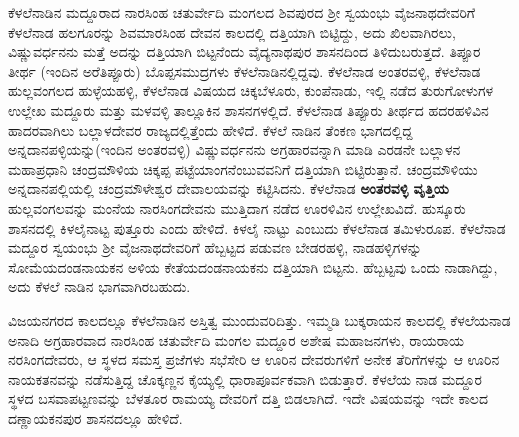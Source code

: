 ಕೆಳಲೆನಾಡಿನ ಮದ್ದೂರಾದ ನಾರಸಿಂಹ ಚತುರ್ವೇದಿ ಮಂಗಲದ ಶಿವಪುರದ ಶ‍್ರೀ ಸ್ವಯಂಭು ವೈಜನಾಥದೇವರಿಗೆ ಕೆಳಲೆನಾಡ ಹಲಗೂರನ್ನು ಶಿವಮಾರಸಿಂಹ ದೇವನ ಕಾಲದಲ್ಲಿ ದತ್ತಿಯಾಗಿ ಬಿಟ್ಟಿದ್ದು, ಅದು ಖಿಲವಾಗಿರಲು, ವಿಷ್ಣುವರ್ಧನನು ಮತ್ತೆ ಅದನ್ನು ದತ್ತಿಯಾಗಿ ಬಿಟ್ಟನೆಂದು ವೈದ್ಯನಾಥಪುರ ಶಾಸನದಿಂದ ತಿಳಿದುಬರುತ್ತದೆ. ತಿಪ್ಪೂರ ತೀರ್ಥ (ಇಂದಿನ ಅರೆತಿಪ್ಪೂರು) ಬೊಪ್ಪಸಮುದ್ರಗಳು ಕೆಳಲೆನಾಡಿನಲ್ಲಿದ್ದವು. ಕೆಳಲೆನಾಡ ಅಂತರವಳ್ಳಿ, ಕೆಳಲೆನಾಡ ಹುಲ್ಲವಂಗಲದ ಹುಳ್ಳೆಯಹಳ್ಳಿ, ಕೆಳಲೆನಾಡ ವಿಷಯದ ಚಿಕ್ಕಬೆಳೂರು, ಕುಂಪೆನಾಡು, ಇಲ್ಲಿ ನಡೆದ ತುರುಗೋಳುಗಳ ಉಲ್ಲೇಖ ಮದ್ದೂರು ಮತ್ತು ಮಳವಳ್ಳಿ ತಾಲ್ಲೂಕಿನ ಶಾಸನಗಳಲ್ಲಿದೆ. ಕೆಳಲೆನಾಡ ತಿಪ್ಪೂರು ತೀರ್ಥದ ಹದರಹಳಿವಿನ ಹಾದರವಾಗಿಲು ಬಲ್ಲಾಳದೇವರ ರಾಜ್ಯದಲ್ಲಿತ್ತೆಂದು ಹೇಳಿದೆ. ಕೆಳಲೆ ನಾಡಿನ ತೆಂಕಣ ಭಾಗದಲ್ಲಿದ್ದ ಅನ್ನದಾನಪಳ್ಳಿಯನ್ನು\break (ಇಂದಿನ ಅಂತರವಳ್ಳಿ) ವಿಷ್ಣುವರ್ಧನನು ಅಗ್ರಹಾರವನ್ನಾಗಿ ಮಾಡಿ ಎರಡನೇ ಬಲ್ಲಾಳನ ಮಹಾಪ್ರಧಾನಿ ಚಂದ್ರಮೌಳಿಯ ಚಿಕ್ಕಪ್ಪ ಪಟ್ಟೆಯಾಂಗನೆಂಬುವವನಿಗೆ ದತ್ತಿಯಾಗಿ ಬಿಟ್ಟಿರುತ್ತಾನೆ. ಚಂದ್ರಮೌಳಿಯು ಅನ್ನದಾನಪಲ್ಲಿಯಲ್ಲಿ ಚಂದ್ರಮೌಳೇಶ್ವರ ದೇವಾಲಯವನ್ನು ಕಟ್ಟಿಸಿದನು. ಕೆಳಲೆನಾಡ \textbf{ಅಂತರವಳ್ಳಿ ವೃತ್ತಿಯ} ಹುಲ್ಲವಂಗಲವನ್ನು ಮಂನೆಯ ನಾರಸಿಂಗದೇವನು ಮುತ್ತಿದಾಗ ನಡೆದ ಊರಳಿವಿನ ಉಲ್ಲೇಖವಿದೆ. ಹುಸ್ಕೂರು ಶಾಸನದಲ್ಲಿ ಕಿಳಲೈನಾಟ್ಟ ಪುತ್ತೂರು ಎಂದು ಹೇಳಿದೆ. ಕಿಳಲೈ ನಾಟ್ಟು ಎಂಬುದು ಕೆಳಲೆನಾಡ ತಮಿಳುರೂಪ. ಕೆಳಲೆನಾಡ ಮದ್ದೂರ ಸ್ವಯಂಭು ಶ‍್ರೀ ವೈಜನಾಥದೇವರಿಗೆ ಹೆಬ್ಬಟ್ಟದ ಪಡುವಣ ಬೇಡರಹಳ್ಳಿ, ನಾಡಹಳ್ಳಿಗಳನ್ನು ಸೋಮೆಯದಂಡನಾಯಕನ ಅಳಿಯ ಕೇತೆಯದಂಡನಾಯಕನು ದತ್ತಿಯಾಗಿ ಬಿಟ್ಟನು. ಹೆಬ್ಬಟ್ಟವು ಒಂದು ನಾಡಾಗಿದ್ದು, ಅದು ಕೆಳಲೆ ನಾಡಿನ ಭಾಗವಾಗಿರಬಹುದು.

\newpage

ವಿಜಯನಗರದ ಕಾಲದಲ್ಲೂ ಕೆಳಲೆನಾಡಿನ ಅಸ್ತಿತ್ವ ಮುಂದುವರಿದಿತ್ತು. ಇಮ್ಮಡಿ ಬುಕ್ಕರಾಯನ ಕಾಲದಲ್ಲಿ ಕೆಳಲೆಯನಾಡ ಅನಾದಿ ಅಗ್ರಹಾರವಾದ ನಾರಸಿಂಹ ಚತುರ್ವೇದಿ ಮಂಗಲ ಮದ್ದೂರ ಅಶೇಷ ಮಹಾಜನಗಳು, ರಾಯರಾಯ ನರಸಿಂಗದೇವರು, ಆ ಸ್ಥಳದ ಸಮಸ್ತ ಪ್ರಜೆಗಳು ಸಭೆಸೇರಿ ಆ ಊರಿನ ದೇವರುಗಳಿಗೆ ಅನೇಕ ತೆರಿಗೆಗಳನ್ನು ಆ ಊರಿನ ನಾಯಕತನವನ್ನು ನಡೆಸುತ್ತಿದ್ದ ಚೊಕ್ಕಣ್ಣನ ಕೈಯ್ಯಲ್ಲಿ ಧಾರಾಪೂರ್ವಕವಾಗಿ ಬಿಡುತ್ತಾರೆ. ಕೆಳಲೆಯ ನಾಡ ಮದ್ದೂರ ಸ್ಥಳದ ಬಸವಾಪಟ್ಟಣವನ್ನು ಬೆಳತೂರ ರಾಮಯ್ಯ ದೇವರಿಗೆ ದತ್ತಿ ಬಿಡಲಾಗಿದೆ. ಇದೇ ವಿಷಯವನ್ನು ಇದೇ ಕಾಲದ ದಣ್ಣಾಯಕನಪುರ ಶಾಸನದಲ್ಲೂ ಹೇಳಿದೆ.

